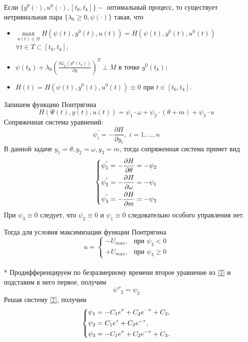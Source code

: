 \documentclass[a4paper,14pt]{article}
\theoremstyle{plain} %
\theoremstyle{definition} %
\theoremstyle{remark} %
\begin{document}
{Если $\{y^0(\cdot),u^0(\cdot),[t_0,t_k]\} - $ оптимальный процесс, то существует нетривиальная пара $\{\lambda_0\geq0,\psi(\cdot)\}$
такая, что
\begin{itemize}
    \item $ \mathop {\max }\limits_{u(t) \in \Omega}  H(\psi(t),y^0(t),u(t))=H(\psi(t),y^0(t),u^0(t))$
          $\forall t \in T \subset [t_0,t_k];$
    \item $\psi(t_k)+\lambda_0(\frac{\partial \varphi_0(y^0(t_k))}{\partial y})^T \perp M \text{ в точке } y^0(t_k);$
    \item $H(t)=H(\psi(t),y^0(t),u^0(t))\equiv0 \text{ при } t \in [t_0,t_k].$
\end{itemize}
Запишем функцию Понтрягина
\[
    H(\Psi(t),y(t),u(t))=\psi_1\cdot\omega+\psi_2\cdot(\theta+m)+\psi_3\cdot u
\]
Сопряженная система уравнений:
\[
    \psi^{'}_i  =  - \frac{{\partial H}}{{\partial y_i }},\,\,i = 1, \ldots ,n
\]
В данной задаче $y_1 = \theta, y_2 = \omega, y_3=m$, тогда сопряженная система примет вид
\begin{equation} \label{7}
    \left\{ {\begin{aligned}
                 & \psi^{'}_1=  - \frac{{\partial H}}{{\partial \theta}} = - \psi_2\hfill  \\
                 & \psi^{'}_2=  - \frac{{\partial H}}{{\partial \omega }} = - \psi_1\hfill \\
                 & \psi^{'}_3=  - \frac{{\partial H}}{{\partial m }} = - \psi_2 \hfill     \\
            \end{aligned}} \right.
\end{equation}
При $\psi_3\equiv0$ следует, что $\psi_2\equiv0$ и $\psi_1\equiv0$ следовательно особого управления нет.

Тогда для условия максимизации функции Понтрягина
\[
    u=
    \begin{cases}
        -U_{max}, & \text{при $\psi_3<0$}    \\
        +U_{max}, & \text{при $\psi_3\geq0$}
    \end{cases}
\]\\*
Продифференцируем по безразмерному времени второе уравнение из \eqref{7} и подставим в него первое, получим
\[
    \psi{''}_2=\psi_2
\]
Решая систему \eqref{7}, получим
\[
    \left\{ {\begin{aligned}
                 & \psi_1 = -C_1e^\tau+C_2e^{-\tau}+C_3, \hfill  \\
                 & \psi_2 = C_1e^\tau+C_2e^{-\tau} , \hfill      \\
                 & \psi_3 = -C_1e^\tau+C_2e^{-\tau}+C_3 . \hfill \\
            \end{aligned}} \right.
\]

}
\end{document}
